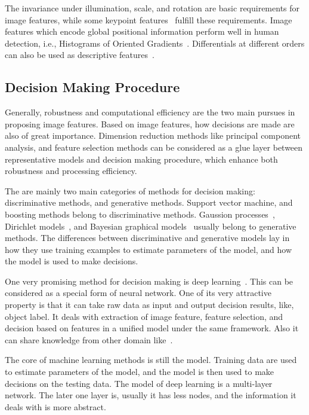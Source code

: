 The invariance under illumination, scale, and rotation are basic requirements for image features, while some keypoint features~\citep{ij2,o12,o14,o15,o2} fulfill these requirements. Image features which encode global positional information perform well in human detection, i.e., Histograms of Oriented
Gradients~\citep{ij4}. Differentials at different orders can also be used as descriptive features~\citep{regionc}.



\subsection{Decision Making Procedure}
Generally, robustness and computational efficiency are the two main pursues in proposing image features. Based on image features, how decisions are made are also of great importance. Dimension reduction methods like principal component analysis, and feature selection methods can be considered as a glue layer between representative models and decision making procedure, which enhance both robustness and processing efficiency.

The are mainly two main categories of methods for decision making: discriminative methods, and generative methods.
Support vector machine, and boosting methods belong to discriminative methods. Gaussion processes~\citep{gprocess}, Dirichlet models~\citep{lda,dp,hdp}, and Bayesian graphical models~\citep{bgm} usually belong to generative methods. The differences between discriminative and generative models lay in how they use training examples to estimate parameters of the model, and how the model is used to make decisions.

One very promising method for decision making is deep learning~\citep{dlearn}. This can be considered as a special form of neural network. One of its very attractive property is that it can take raw data as input and output decision results, like, object label. It deals with extraction of image feature, feature selection, and decision based on features in a unified model under the same framework. Also it can share knowledge from other domain like~\citep{tlsurvey}.

The core of machine learning methods is still the model. Training data are used to estimate  parameters of the model, and the model is then used to make decisions on the testing data. The model of deep learning is a multi-layer network. The later one layer is, usually it has less nodes, and the information it deals with is more abstract.

